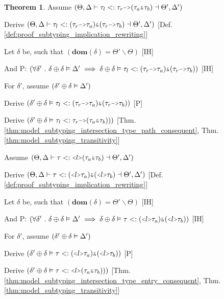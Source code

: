\documentclass[acmsmall]{acmart}
\theoremstyle{definition}
\newtheorem{theorem}{Theorem}[section]
\begin{document}
\begin{theorem}

  \item \N Assume $(
    \Theta, \Delta \entails 
    \tau_l \subtypes 
    \tau_r\J{->}(\tau_{a}\J{\&}\tau_{b})
    \given \Theta', \Delta'
  )$ 
  \item \I \N Derive $(
    \Theta, \Delta \entails 
    \tau_l
    \subtypes
    (\tau_r\J{->}\tau_a)
    \J{\&}
    (\tau_r\J{->}\tau_b)
    \given \Theta', \Delta' 
  )$ [Def. \ref{def:proof_subtyping_implication_rewriting}]

  \item \I \N Let $\delta$ be, such that $(
    \textbf{dom}(\delta) = \Theta' \backslash \Theta
  )$ [IH]
  \item \I \N And P: $(
    \forall \delta' \qua 
    \delta \oplus \delta \satisfies \Delta' 
    \implies 
    \delta \oplus \delta \satisfies \tau_l \subtypes 
    (\tau_r\J{->}\tau_a) \J{\&} (\tau_r\J{->}\tau_b)
  )$ [IH]
  \item \I \N For $\delta'$, assume $(\delta' \oplus \delta \vDash \Delta')$
  \item \I\I \N Derive $(
    \delta' \oplus \delta \satisfies \tau_l \subtypes
    (\tau_r\J{->}\tau_a) \J{\&} (\tau_r\J{->}\tau_b)
  )$ [P]
  \item \I\I \N Derive $(
    \delta' \oplus \delta \satisfies \tau_l \subtypes \tau_r\J{->}(\tau_a\J{\&}\tau_b))
  )$ [Thm. \ref{thm:model_subtyping_intersection_type_path_consequent}, Thm. \ref{thm:model_subtyping_transitivity}]



  \item \N Assume $(
    \Theta, \Delta \entails 
    \tau \subtypes 
    \J{<} l \J{>} (\tau_{a}\J{\&}\tau_{b})
    \given \Theta', \Delta'
  )$ 
  \item \I \N Derive $(
    \Theta, \Delta \entails 
    \tau
    \subtypes
    (\J{<} l \J{>} \tau_a)
    \J{\&}
    (\J{<} l \J{>} \tau_b)
    \given \Theta', \Delta' 
  )$ [Def. \ref{def:proof_subtyping_implication_rewriting}]

  \item \I \N Let $\delta$ be, such that $(
    \textbf{dom}(\delta) = \Theta' \backslash \Theta
  )$ [IH]
  \item \I \N And P: $(
    \forall \delta' \qua 
    \delta \oplus \delta \satisfies \Delta' 
    \implies 
    \delta \oplus \delta \satisfies 
    \tau
    \subtypes
    (\J{<} l \J{>} \tau_a)
    \J{\&}
    (\J{<} l \J{>} \tau_b)
  )$ [IH]
  \item \I \N For $\delta'$, assume $(\delta' \oplus \delta \vDash \Delta')$
  \item \I\I \N Derive $(
    \delta' \oplus \delta \satisfies 
    \tau \subtypes
    (\J{<} l \J{>} \tau_a)
    \J{\&}
    (\J{<} l \J{>} \tau_b)
  )$ [P]
  \item \I\I \N Derive $(
    \delta' \oplus \delta \satisfies \tau \subtypes \J{<} l \J{>}(\tau_a\J{\&}\tau_b))
  )$ [Thm. \ref{thm:model_subtyping_intersection_type_entry_consequent}, Thm. \ref{thm:model_subtyping_transitivity}]


\end{theorem}
\end{document}
